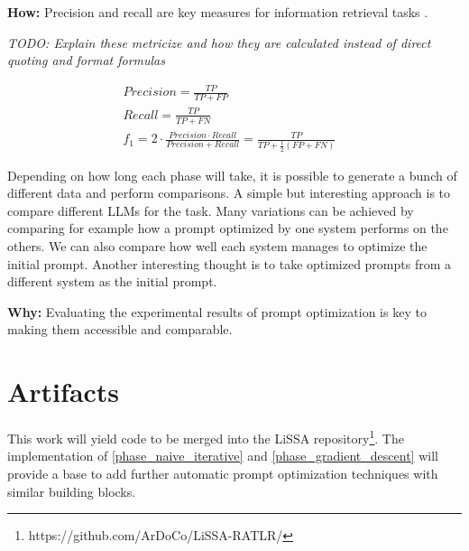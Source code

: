 \textbf{How:} Precision and recall are key measures for information retrieval tasks \cite{hayes2006AdvancingCandidate}. 

\textit{TODO: Explain these metricize and how they are calculated instead of direct quoting and format formulas} 

\begin{align*} 
    Precision = \frac{TP}{TP + FP} &\\
    Recall = \frac{TP}{TP + FN} &\\
    f_1 = 2 \cdot \frac{Precision \cdot Recall}{Precision + Recall} = \frac{TP}{TP + \frac{1}{2}(FP + FN)} &
\end{align*}



Depending on how long each phase will take, it is possible to generate a bunch of different data and perform comparisons.
A simple but interesting approach is to compare different LLMs for the task. Many variations can be achieved by comparing for example how a prompt optimized by one system performs on the others. We can also compare how well each system manages to optimize the initial prompt. 
Another interesting thought is to take optimized prompts from a different system as the initial prompt. 


\textbf{Why:} Evaluating the experimental results of prompt optimization is key to making them accessible and comparable. 







\section{Artifacts}
This work will yield code to be merged into the LiSSA repository\footnote{https://github.com/ArDoCo/LiSSA-RATLR/}. The implementation of \ref{phase_naive_iterative} and \ref{phase_gradient_descent} will provide a base to add further automatic prompt optimization techniques with similar building blocks.

